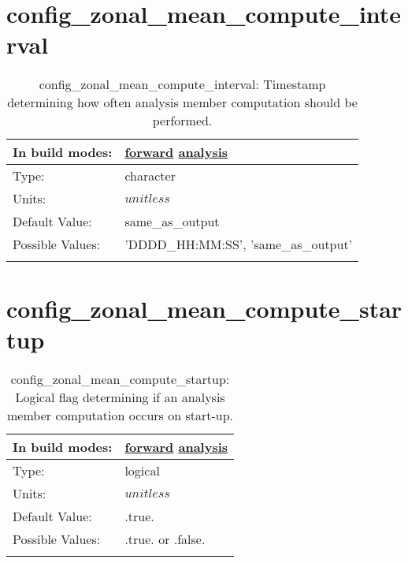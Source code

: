 \section[config\_zonal\_mean\_compute\_interval]{config\_zonal\_mean\_compute\_interval}
\label{sec:nm_sec_config_zonal_mean_compute_interval}
\begin{center}
\begin{longtable}{| p{2.0in} || p{4.0in} |}
    \hline
    In build modes: & \hyperref[subsec:forward_nm_tab_zonal_mean]{forward} \hyperref[subsec:analysis_nm_tab_zonal_mean]{analysis} \\
    \hline
    Type: & character \\
    \hline
    Units: & $unitless$ \\
    \hline
    Default Value: & same\_as\_output \\
    \hline
    Possible Values: & 'DDDD\_HH:MM:SS', 'same\_as\_output' \\
    \hline
    \caption{config\_zonal\_mean\_compute\_interval: Timestamp determining how often analysis member computation should be performed.}
\end{longtable}
\end{center}
\section[config\_zonal\_mean\_compute\_startup]{config\_zonal\_mean\_compute\_startup}
\label{sec:nm_sec_config_zonal_mean_compute_startup}
\begin{center}
\begin{longtable}{| p{2.0in} || p{4.0in} |}
    \hline
    In build modes: & \hyperref[subsec:forward_nm_tab_zonal_mean]{forward} \hyperref[subsec:analysis_nm_tab_zonal_mean]{analysis} \\
    \hline
    Type: & logical \\
    \hline
    Units: & $unitless$ \\
    \hline
    Default Value: & .true. \\
    \hline
    Possible Values: & .true. or .false. \\
    \hline
    \caption{config\_zonal\_mean\_compute\_startup: Logical flag determining if an analysis member computation occurs on start-up.}
\end{longtable}
\end{center}
